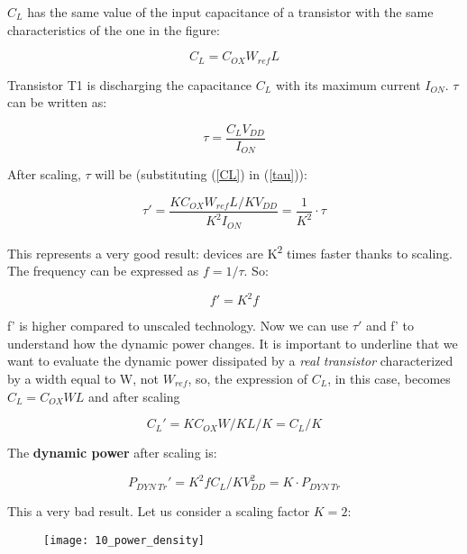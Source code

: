\documentclass[a4paper, 12pt, twoside, openright]{report}
\newcommand{\super}{\textsuperscript}
\begin{document}
\begin{enumerate}
$C_{L}$ has the same value of the input capacitance of a transistor with the same characteristics of the one in the figure:

	\begin{equation}
	C_{L} = C_{OX} W_{ref} L
	\label{CL}
	\end{equation}

Transistor T1 is discharging the capacitance $C_{L}$ with its maximum current $I_{ON}$. $\tau$ can be written as:

	\begin{equation}
	\tau = \frac{C_L V_{DD}}{I_{ON}}
	\label{tau}
	\end{equation}

After scaling, $\tau$ will be (substituting (\ref{CL}) in (\ref{tau})):

	\begin{equation}
	\tau ' = \frac{K C_{OX} W_{ref} L/K V_{DD}}{K^2 I_{ON}} = \frac{1}{K^2} \cdot \tau
	\end{equation}

This represents a very good result: devices are K\super{2} times faster thanks to scaling.
The frequency can be expressed as $f = 1/\tau$. So:

	\begin{equation}
	f' = K^2 f
	\end{equation}

f' is higher compared to unscaled technology.
Now we can use $\tau'$ and f' to understand how the dynamic power changes. It is important to underline that we want to evaluate the dynamic power dissipated by a \emph{real transistor} characterized by a width equal to W, not $W_{ref}$, so, the expression of $C_{L}$, in this case, becomes $C_L = C_{OX} W L$ and after scaling

	\begin{equation}
	C_L ' = K C_{OX} W/K L/K = C_L/K
	\end{equation}

The \textbf{dynamic power} after scaling is:

	\begin{equation}
	P_{DYN \ Tr}' =  K^2 f C_L/K V_{DD}^2 = K \cdot P_{DYN \ Tr}
	\end{equation}

This a very bad result. Let us consider a scaling factor $K = 2$:

	\begin{figure}[H]
	\centering
	\texttt{[image: 10\_power\_density]}
	\caption{}
	\label{}
	\end{figure}


\end{enumerate}
\end{document}
